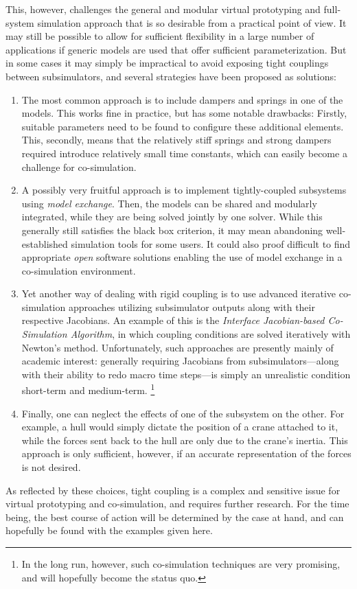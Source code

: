 \documentclass[prb,aps,showpacs,floatfix,twocolumn,10pt]{revtex4-1}
\newcommand{\sub}{subsimulator}
\theoremstyle{plain}
\theoremstyle{remark}
\begin{document}
This, however, challenges the general and modular virtual prototyping and full-system simulation approach that is so desirable from a practical point of view.
It may still be possible to allow for sufficient flexibility in a large number of applications if generic models are used that offer sufficient parameterization.
But in some cases it may simply be impractical to avoid exposing tight couplings between \sub{}s, and several strategies have been proposed as solutions:
\begin{enumerate}
	\item The most common approach is to include dampers and springs in one of the models.
	This works fine in practice, but has some notable drawbacks: Firstly, suitable parameters need to be found to configure these additional elements. This, secondly, means that the relatively stiff springs and strong dampers required introduce relatively small time constants, which can easily become a challenge for co-simulation.
	\item A possibly very fruitful approach is to implement tightly-coupled subsystems using \emph{model exchange}.
	Then, the models can be shared and modularly integrated, while they are being solved jointly by one solver.
	While this generally still satisfies the black box criterion, it may mean abandoning well-established simulation tools for some users.
	It could also proof difficult to find appropriate \emph{open} software solutions enabling the use of model exchange in a co-simulation environment.
	\item Yet another way of dealing with rigid coupling is to use advanced iterative co-simulation approaches utilizing \sub{} outputs along with their respective Jacobians.
	An example of this is the \emph{Interface Jacobian-based Co-Simulation Algorithm}\cite{Sicklinger2014}, in which coupling conditions are solved iteratively with Newton's method.
	Unfortunately, such approaches are presently mainly of academic interest:
	generally requiring Jacobians from \sub{}s---along with their ability to redo macro time steps---is simply an unrealistic condition short-term and medium-term.
	\footnote{%
		In the long run, however, such co-simulation techniques are very promising, and will hopefully become the status quo.
	}
	\item Finally, one can neglect the effects of one of the subsystem on the other.
	For example, a hull would simply dictate the position of a crane attached to it, while the forces sent back to the hull are only due to the crane's inertia.
	This approach is only sufficient, however, if an accurate representation of the forces is not desired.
\end{enumerate}
As reflected by these choices, tight coupling is a complex and sensitive issue for virtual prototyping and co-simulation, and requires further research.
For the time being, the best course of action will be determined by the case at hand, and can hopefully be found with the examples given here.
\end{document}
